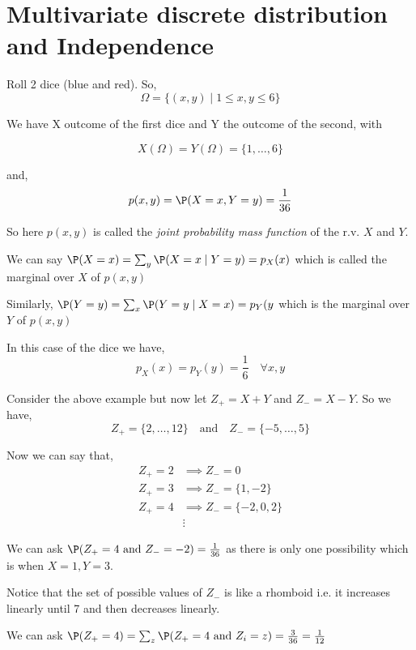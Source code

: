 \chapter{Multivariate discrete distribution and Independence}


\begin{eg}
	Roll 2 dice (blue and red). So, 
	$$
		\Omega = \{(x, y) \mid 1 \le x, y \le 6 \}
	$$
	
	\vspace{1em}
	
	We have X outcome of the first dice and Y the outcome of the second, with

	$$
	X(\Omega) = Y(\Omega) = \{1, \dots, 6\}
	$$

	and, $$
	p(x, y) = \P(X = x, Y = y) = \frac{1}{36}
	$$

	So here $p(x,y)$ is called the \emph{joint probability mass function} of the r.v. $X$ and $Y$.

	\vspace{1em}
	
	We can say $\P(X = x) = \sum_y \P(X = x \mid Y = y) = p_X(x)$ which is called the marginal over $X$ of $p(x, y)$

	Similarly, $\P(Y = y) = \sum_x \P(Y = y \mid X  = x) = p_Y(y$ which is the marginal over $Y$ of $p(x, y)$

	\vspace{1em}
	
	In this case of the dice we have,
	$$
	p_X(x) = p_Y(y) = \frac{1}{6} \quad \forall x,y
	$$

	\vspace{1em}
	
\end{eg}
\begin{eg}
	Consider the above example but now let $Z_+ = X + Y$ and $Z_- = X - Y$. So we have,$$
	Z_+ = \{2, \dots, 12\} \quad \text{and} \quad  Z_-= \{-5, \dots, 5\}
	$$


	Now we can say that,
	\begin{align*}
		Z_+  = 2 &\implies Z_- = 0\\
		Z_+  = 3 &\implies Z_- = \{1, -2\}\\
		Z_+  = 4 &\implies Z_- = \{-2, 0, 2\}\\
			 &\vdots
	\end{align*}


	We can ask $\P(Z_+ =  4 \text{ and } Z_- = -2) = \frac{1}{36}$  as there is only one possibility which is when $X = 1, Y = 3$.

	\vspace{1em}
	
	Notice that the set of possible values of $Z_-$ is like a rhomboid i.e. it increases linearly until 7 and then decreases linearly.

	\vspace{1em}
	
	We can ask $\P(Z_+ = 4) = \sum_z \P(Z_+ = 4 \text{ and } Z_i = z) = \frac{3}{36} = \frac{1}{12}$


	\vspace{1em}
	
\end{eg}

